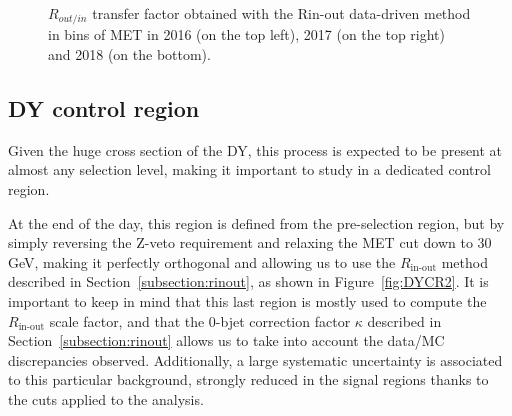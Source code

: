 \documentclass[a4paper, 10pt, openright]{report}
\begin{document}
\begin{figure}[htbp]
\begin{center}
\begin{minipage}[b]{.99\textwidth}
\begin{center}
\end{center}
\end{minipage} \hfill
\caption{$R_{out/in}$ transfer factor obtained with the Rin-out data-driven method in bins of \ac{MET} in 2016 (on the top left), 2017 (on the top right) and 2018 (on the bottom).}
\label{fig:Rinoutcheck}
\end{center}
\end{figure}

\subsection{\acs{DY} control region} \label{section:DYCR}

Given the huge cross section of the \ac{DY}, this process is expected to be present at almost any selection level, making it important to study in a dedicated control region. %

At the end of the day, this region is defined from the pre-selection region, but by simply reversing the Z-veto requirement and relaxing the \ac{MET} cut down to 30 GeV, making it perfectly orthogonal and allowing us to use the $R_{\text{in-out}}$ method described in Section~\ref{subsection:rinout}, as shown in Figure~\ref{fig:DYCR2}. It is important to keep in mind that this last region is mostly used to compute the $R_{\text{in-out}}$ scale factor, and that the 0-bjet correction factor $\kappa$ described in Section~\ref{subsection:rinout} allows us to take into account the data/MC discrepancies observed. Additionally, a large systematic uncertainty is associated to this particular background, strongly reduced in the signal regions thanks to the cuts applied to the analysis.
\end{document}
